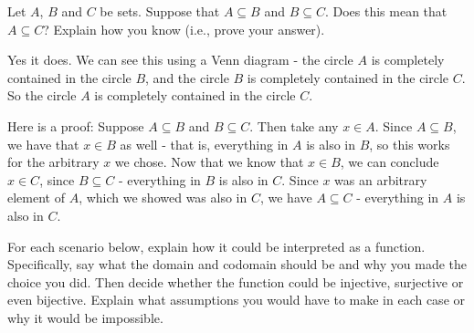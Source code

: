 \documentclass[11pt]{exam}
\begin{document}
\begin{questions}
\question[6] Let $A$, $B$ and $C$ be sets.  Suppose that $A \subseteq B$ and $B \subseteq C$.  Does this mean that $A \subseteq C$?  Explain how you know (i.e., prove your answer).

\begin{solution}
 Yes it does.  We can see this using a Venn diagram - the circle $A$ is completely contained in the circle $B$, and the circle $B$ is completely contained in the circle $C$.  So the circle $A$ is completely contained in the circle $C$.  
 
 Here is a proof: Suppose $A \subseteq B$ and $B \subseteq C$.  Then take any $x \in A$.  Since $A \subseteq B$, we have that $x \in B$ as well - that is, everything in $A$ is also in $B$, so this works for the arbitrary $x$ we chose.  Now that we know that $x \in B$, we can conclude $x \in C$, since $B \subseteq C$ - everything in $B$ is also in $C$.  Since $x$ was an arbitrary element of $A$, which we showed was also in $C$, we have $A \subseteq C$ - everything in $A$ is also in $C$.
\end{solution}





\question[10] For each scenario below, explain how it could be interpreted as a function.  Specifically, say what the domain and codomain should be and why you made the choice you did.  Then decide whether the function could be injective, surjective or even bijective.  Explain what assumptions you would have to make in each case or why it would be impossible.  
\end{questions}
\end{document}

